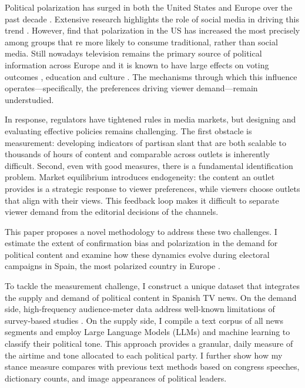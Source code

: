 \documentclass[12pt]{article}
\begin{document}
	
	
	

Political polarization has surged in both the United States and Europe over the past decade \citep{ Reiljan2019FearAL}. Extensive research highlights the role of social media in driving this trend \citep{Zhuravskaya2020}. However, \cite{Boxell2020CrossCountryTI}  find that polarization in the US has increased the most  precisely among groups that re more likely to consume traditional, rather than social media. Still nowadays television remains the primary source of political information across Europe and it is known to have large effects on voting outcomes \citep{dellavigna2007fox, gentzkow_turnout, martin2017}, education \citep{gentzkow2008preschool} and culture \citep{jensen2009power}. The mechanisms through which this influence operates—specifically, the preferences driving viewer demand—remain understudied.

In response, regulators have tightened rules in media markets, but designing and evaluating effective policies remains challenging. The first obstacle is measurement: developing indicators of partisan slant that are both scalable to thousands of hours of content and comparable across outlets is inherently difficult. Second, even with good measures, there is a fundamental identification problem. Market equilibrium introduces endogeneity: the content an outlet provides is a strategic response to viewer preferences, while viewers choose outlets that align with their views. This feedback loop makes it difficult to separate viewer demand from the editorial decisions of the channels.

This paper proposes a novel methodology to address these two challenges. I estimate the extent of confirmation bias and polarization in the demand for political content and examine how these dynamics evolve during electoral campaigns in Spain, the most polarized country in Europe \citep{edelman_trust_2023}.

To tackle the measurement challenge, I construct a unique dataset that integrates the supply and demand of political content in Spanish TV news. On the demand side, high-frequency audience-meter data address well-known limitations of survey-based studies \citep{prior}. On the supply side, I compile a text corpus of all news segments and employ Large Language Models (LLMs) and machine learning to classify their political tone. This approach provides a granular, daily measure of the airtime and tone allocated to each political party. I further show how my stance measure compares with previous text methods based on congress speeches, dictionary counts, and image appearances of political leaders.
\end{document}

